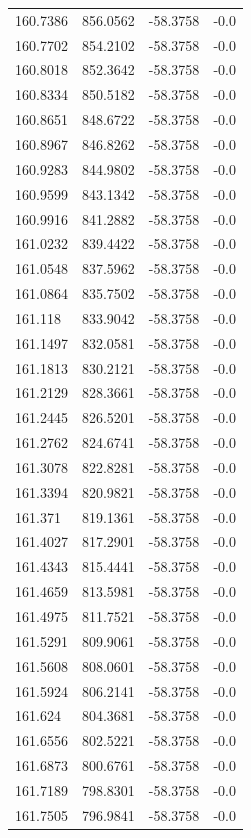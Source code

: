 \begin{table}[H]
\begin{tabular}{llll}
160.7386 & 856.0562 & -58.3758 & -0.0 \\
160.7702 & 854.2102 & -58.3758 & -0.0 \\
160.8018 & 852.3642 & -58.3758 & -0.0 \\
160.8334 & 850.5182 & -58.3758 & -0.0 \\
160.8651 & 848.6722 & -58.3758 & -0.0 \\
160.8967 & 846.8262 & -58.3758 & -0.0 \\
160.9283 & 844.9802 & -58.3758 & -0.0 \\
160.9599 & 843.1342 & -58.3758 & -0.0 \\
160.9916 & 841.2882 & -58.3758 & -0.0 \\
161.0232 & 839.4422 & -58.3758 & -0.0 \\
161.0548 & 837.5962 & -58.3758 & -0.0 \\
161.0864 & 835.7502 & -58.3758 & -0.0 \\
161.118 & 833.9042 & -58.3758 & -0.0 \\
161.1497 & 832.0581 & -58.3758 & -0.0 \\
161.1813 & 830.2121 & -58.3758 & -0.0 \\
161.2129 & 828.3661 & -58.3758 & -0.0 \\
161.2445 & 826.5201 & -58.3758 & -0.0 \\
161.2762 & 824.6741 & -58.3758 & -0.0 \\
161.3078 & 822.8281 & -58.3758 & -0.0 \\
161.3394 & 820.9821 & -58.3758 & -0.0 \\
161.371 & 819.1361 & -58.3758 & -0.0 \\
161.4027 & 817.2901 & -58.3758 & -0.0 \\
161.4343 & 815.4441 & -58.3758 & -0.0 \\
161.4659 & 813.5981 & -58.3758 & -0.0 \\
161.4975 & 811.7521 & -58.3758 & -0.0 \\
161.5291 & 809.9061 & -58.3758 & -0.0 \\
161.5608 & 808.0601 & -58.3758 & -0.0 \\
161.5924 & 806.2141 & -58.3758 & -0.0 \\
161.624 & 804.3681 & -58.3758 & -0.0 \\
161.6556 & 802.5221 & -58.3758 & -0.0 \\
161.6873 & 800.6761 & -58.3758 & -0.0 \\
161.7189 & 798.8301 & -58.3758 & -0.0 \\
161.7505 & 796.9841 & -58.3758 & -0.0 \\

\end{tabular}
\end{table}
